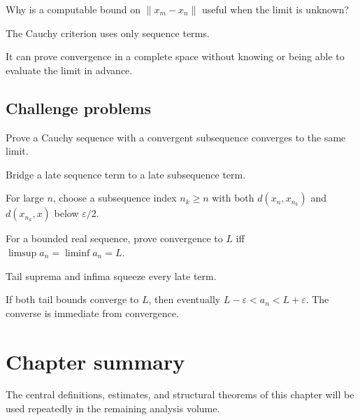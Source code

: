 \begin{exercise}\label{exr:ii03-expand-14}
Why is a computable bound on \(\|x_m-x_n\|\) useful when the limit is unknown?
\end{exercise}
\begin{hint}
The Cauchy criterion uses only sequence terms.
\end{hint}
\begin{solution}
It can prove convergence in a complete space without knowing or being able to evaluate the limit in advance.
\end{solution}

\subsection*{Challenge problems}

\begin{exercise}\label{exr:ii03-expand-15}
Prove a Cauchy sequence with a convergent subsequence converges to the same limit.
\end{exercise}
\begin{hint}
Bridge a late sequence term to a late subsequence term.
\end{hint}
\begin{solution}
For large \(n\), choose a subsequence index \(n_k\ge n\) with both \(d(x_n,x_{n_k})\) and \(d(x_{n_k},x)\) below \(\varepsilon/2\).
\end{solution}

\begin{exercise}\label{exr:ii03-expand-16}
For a bounded real sequence, prove convergence to \(L\) iff \(\limsup a_n=\liminf a_n=L\).
\end{exercise}
\begin{hint}
Tail suprema and infima squeeze every late term.
\end{hint}
\begin{solution}
If both tail bounds converge to \(L\), then eventually \(L-\varepsilon<a_n<L+\varepsilon\). The converse is immediate from convergence.
\end{solution}
\section*{Chapter summary}
The central definitions, estimates, and structural theorems of this chapter will be used repeatedly in the remaining analysis volume.
